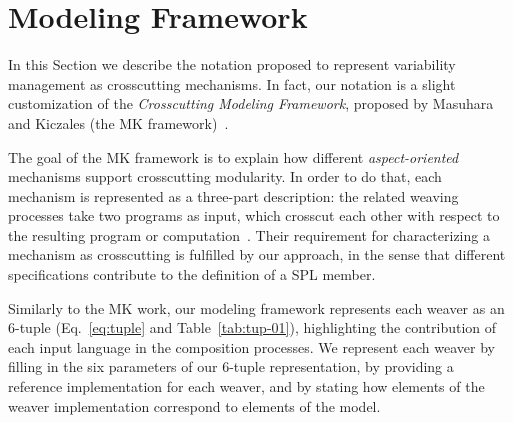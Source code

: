 \documentclass{sig-alternate}
\begin{document}
%



\section{Modeling Framework}\label{sec:modeling-framework}

In this Section we describe the notation proposed to represent variability
management as crosscutting mechanisms. In fact, our notation is a slight
customization of the \emph{Crosscutting Modeling Framework}, proposed by Masuhara
and Kiczales (the MK framework)~\cite{Masuhara:2003aa}. 

The goal of the MK
framework is to explain how different \emph{aspect-oriented} mechanisms support
crosscutting modularity. In order to do that, each mechanism is represented as a
three-part description: the related weaving processes take two programs as input,
which crosscut each other with respect to the resulting program or
computation~\cite{Masuhara:2003aa}.
Their requirement for characterizing a mechanism as crosscutting is fulfilled by
our approach, in the sense that different specifications contribute to the
definition of a SPL member. 


Similarly to the MK work, our modeling framework represents each
weaver as an 6-tuple (Eq.~\ref{eq:tuple} and Table~\ref{tab:tup-01}),
highlighting the contribution of each input language in the composition
processes. We represent each weaver by filling in the six parameters of our
6-tuple representation, by providing a reference implementation for each weaver,
and by stating how elements of the weaver implementation correspond to elements
of the model.
\end{document}
